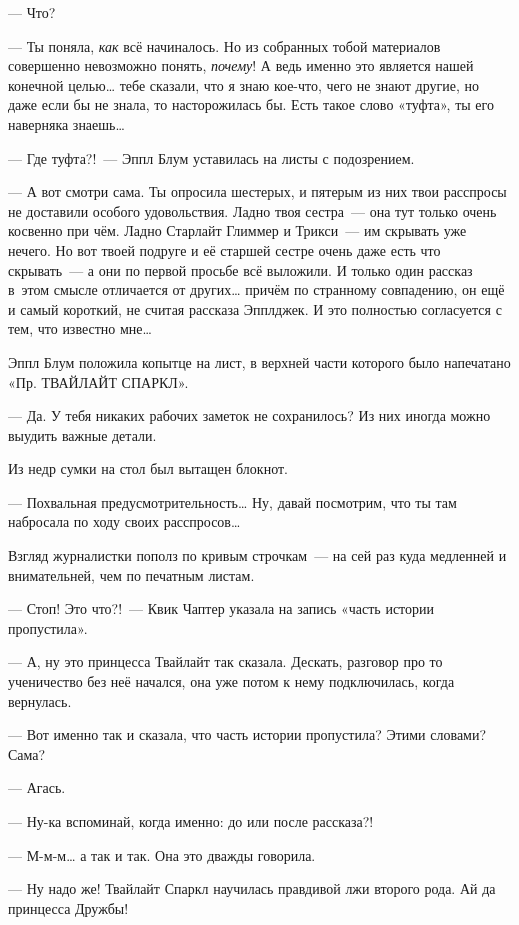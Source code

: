 \documentclass[fontsize=11pt,a5paper,titlepage=firstcover]{scrbook}
\begin{document}
--- Что?

--- Ты поняла, \emph{как} всё начиналось. Но из собранных тобой материалов совершенно невозможно понять, \emph{почему}! А ведь именно это является нашей конечной целью{\ldots} тебе сказали, что я знаю кое-что, чего не знают другие, но даже если бы не знала, то насторожилась бы. Есть такое слово «туфта», ты его наверняка знаешь{\ldots}

--- Где туфта?!~--- Эппл Блум уставилась на листы с подозрением.

--- А вот смотри сама. Ты опросила шестерых, и пятерым из них твои расспросы не доставили особого удовольствия. Ладно твоя сестра~--- она тут только очень косвенно при чём. Ладно Старлайт Глиммер и Трикси~--- им скрывать уже нечего. Но вот твоей подруге и её старшей сестре очень даже есть что скрывать~--- а они по первой просьбе всё выложили. И только один рассказ в~этом смысле отличается от других{\ldots} причём по странному совпадению, он ещё и самый короткий, не считая рассказа Эпплджек. И это полностью согласуется с тем, что известно мне{\ldots}

Эппл Блум положила копытце на лист, в верхней части которого было напечатано «Пр. ТВАЙЛАЙТ СПАРКЛ».

--- Да. У тебя никаких рабочих заметок не сохранилось? Из них иногда можно выудить важные детали.

Из недр сумки на стол был вытащен блокнот.

--- Похвальная предусмотрительность{\ldots} Ну, давай посмотрим, что ты там набросала по ходу своих расспросов{\ldots}

Взгляд журналистки пополз по кривым строчкам~--- на сей раз куда медленней и внимательней, чем по печатным листам.

--- Стоп! Это что?!~--- Квик Чаптер указала на запись «часть истории пропустила».

--- А, ну это принцесса Твайлайт так сказала. Дескать, разговор про то ученичество без неё начался, она уже потом к нему подключилась, когда вернулась.

--- Вот именно так и сказала, что часть истории пропустила? Этими словами? Сама?

--- Агась.

--- Ну-ка вспоминай, когда именно: до или после рассказа?!

--- М-м-м{\ldots} а так и так. Она это дважды говорила.

--- Ну надо же! Твайлайт Спаркл научилась правдивой лжи второго рода. Ай да принцесса Дружбы!
\end{document}
